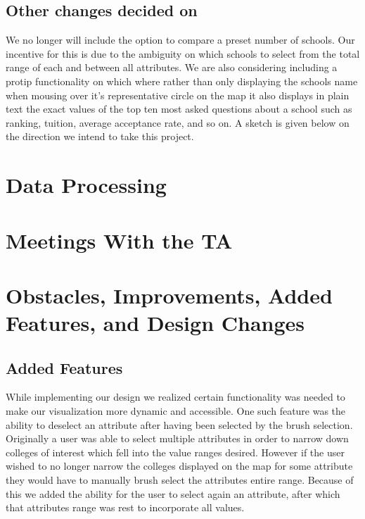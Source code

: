\documentclass[11pt, a4paper]{article}
\begin{document}
\subsection{Other changes decided on}

We no longer will include the option to compare a preset number of schools. Our incentive for this is due to the ambiguity on which schools to select from the total range of each and between all attributes. We are also considering including a protip functionality on which where rather than only displaying the schools name when mousing over it's representative circle on the map it also displays in plain text the exact values of the top ten most asked questions about a school such as ranking, tuition, average acceptance rate, and so on. A sketch is given below on the direction we intend to take this project.

\begin{figure}[H]
\label{Redesigned Project Visualization}
\end{figure}


\section{Data Processing }

\section{Meetings With the TA}

\section{Obstacles, Improvements, Added Features, and Design Changes}

\subsection{Added Features}
While implementing our design we realized certain functionality was needed to make our visualization more dynamic and accessible. One such feature was the ability to deselect an attribute after having been selected by the brush selection. Originally a user was able to select multiple attributes in order to narrow down colleges of interest which fell into the value ranges desired. However if the user wished to no longer narrow the colleges displayed on the map for some attribute they would have to manually brush select the attributes entire range. Because of this we added the ability for the user to select again an attribute, after which that attributes range was rest to incorporate all values. 
\end{document}
